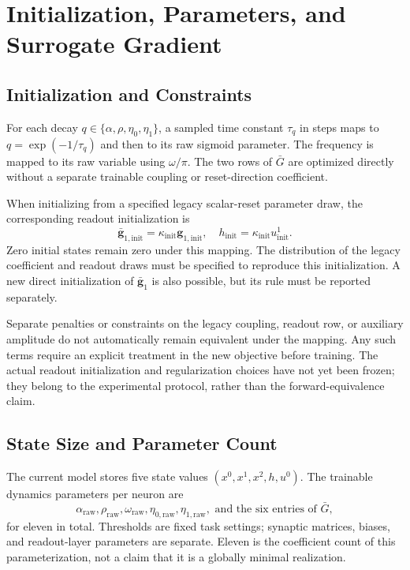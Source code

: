 \documentclass[letterpaper]{article}
\begin{document}
\section{Initialization, Parameters, and Surrogate Gradient}

\subsection{Initialization and Constraints}

For each decay $q\in\{\alpha,\rho,\eta_0,\eta_1\}$, a sampled time constant $\tau_q$ in steps maps to $q=\exp(-1/\tau_q)$ and then to its raw sigmoid parameter. The frequency is mapped to its raw variable using $\omega/\pi$. The two rows of $\bar G$ are optimized directly without a separate trainable coupling or reset-direction coefficient.

When initializing from a specified legacy scalar-reset parameter draw, the corresponding readout initialization is
\begin{equation}
\bar{\mathbf g}_{1,\mathrm{init}}=\kappa_{\mathrm{init}}\mathbf g_{1,\mathrm{init}},\quad
h_{\mathrm{init}}=\kappa_{\mathrm{init}}u^1_{\mathrm{init}}.
\label{eq:supp_init_conversion}
\end{equation}
Zero initial states remain zero under this mapping. The distribution of the legacy coefficient and readout draws must be specified to reproduce this initialization. A new direct initialization of $\bar{\mathbf g}_1$ is also possible, but its rule must be reported separately.

Separate penalties or constraints on the legacy coupling, readout row, or auxiliary amplitude do not automatically remain equivalent under the mapping. Any such terms require an explicit treatment in the new objective before training. The actual readout initialization and regularization choices have not yet been frozen; they belong to the experimental protocol, rather than the forward-equivalence claim.

\subsection{State Size and Parameter Count}

The current model stores five state values $(x^0,x^1,x^2,h,u^0)$. The trainable dynamics parameters per neuron are
\begin{equation}
\alpha_{\mathrm{raw}},\rho_{\mathrm{raw}},\omega_{\mathrm{raw}},\eta_{0,\mathrm{raw}},\eta_{1,\mathrm{raw}},\text{ and the six entries of }\bar G,
\end{equation}
for eleven in total. Thresholds are fixed task settings; synaptic matrices, biases, and readout-layer parameters are separate. Eleven is the coefficient count of this parameterization, not a claim that it is a globally minimal realization.
\end{document}
